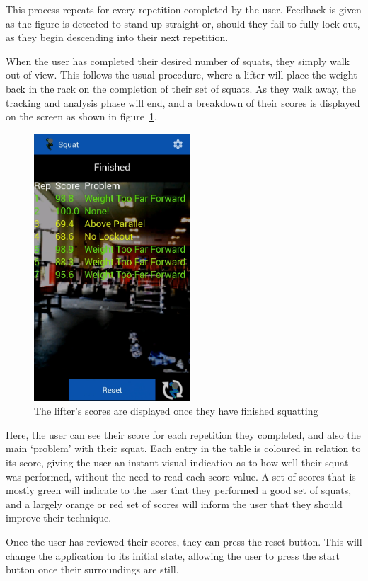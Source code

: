 This process repeats for every repetition completed by the user. Feedback is given as the figure is detected to stand up straight or, should they fail to fully lock out, as they begin descending into their next repetition.

When the user has completed their desired number of squats, they simply walk out of view. This follows the usual procedure, where a lifter will place the weight back in the rack on the completion of their set of squats. As they walk away, the tracking and analysis phase will end, and a breakdown of their scores is displayed on the screen as shown in figure~\ref{fig:scores}.

\begin{figure}[H]
    \centering
	\includegraphics[height=10cm]{application/images/scores}
\caption{The lifter's scores are displayed once they have finished squatting}
\label{fig:scores}
\end{figure}

Here, the user can see their score for each repetition they completed, and also the main `problem' with their squat. Each entry in the table is coloured in relation to its score, giving the user an instant visual indication as to how well their squat was performed, without the need to read each score value. A set of scores that is mostly green will indicate to the user that they performed a good set of squats, and a largely orange or red set of scores will inform the user that they should improve their technique.

Once the user has reviewed their scores, they can press the reset button. This will change the application to its initial state, allowing the user to press the start button once their surroundings are still.